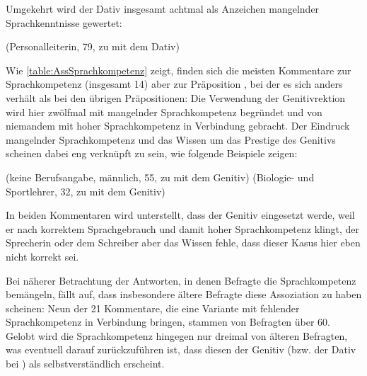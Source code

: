 Umgekehrt wird der Dativ insgesamt achtmal als Anzeichen mangelnder Sprachkenntnisse gewertet: 
\begin{exe}
\ex {} (Personalleiterin, 79, zu \waehrend{} mit dem Dativ)
\end{exe}
Wie \autoref{table:AssSprachkompetenz} zeigt, finden sich die meisten Kommentare zur Sprachkompetenz (insgesamt 14) aber zur Präposition \gegenueber, bei der es sich anders verhält als bei den übrigen Präpositionen: 
Die Verwendung der Genitivrektion wird hier zwölfmal mit mangelnder Sprachkompetenz begründet und von niemandem mit hoher Sprachkompetenz in Verbindung gebracht. 
Der Eindruck mangelnder Sprachkompetenz und das Wissen um das Prestige des Genitivs scheinen dabei eng verknüpft zu sein, wie folgende Beispiele zeigen:  
\begin{exe}
\ex {} (keine Berufsangabe, männlich, 55, zu \gegenueber{} mit dem Genitiv)
\ex {} (Biologie- und Sportlehrer, 32, zu \gegenueber{} mit dem Genitiv)
\end{exe}
In beiden Kommentaren wird unterstellt, dass der Genitiv eingesetzt werde, weil er nach korrektem Sprachgebrauch und damit hoher Sprachkompetenz klingt, der Sprecherin oder dem Schreiber aber das Wissen fehle, dass dieser Kasus hier eben nicht korrekt sei. 

Bei näherer Betrachtung der Antworten, in denen Befragte die Sprachkompetenz bemängeln, fällt auf, dass insbesondere ältere Befragte diese Assoziation zu haben scheinen: 
Neun der 21 Kommentare, die eine Variante mit fehlender Sprachkompetenz in Verbindung bringen, stammen von Befragten über 60. 
Gelobt wird die Sprachkompetenz hingegen nur dreimal von älteren Befragten, was eventuell darauf zurückzuführen ist, dass diesen der Genitiv (bzw. der Dativ bei \gegenueber) als selbstverständlich erscheint. 

